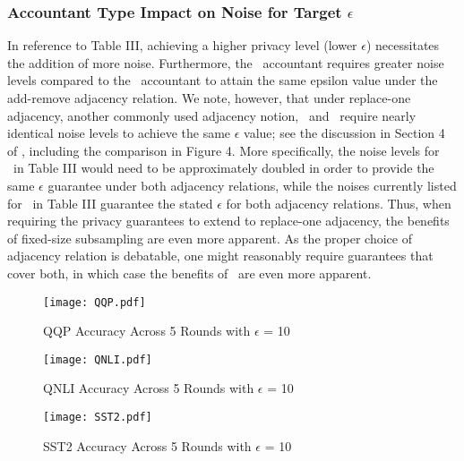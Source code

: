 \subsubsection{Accountant Type Impact on Noise for Target \( \epsilon\)}In reference to Table III, achieving a higher privacy level (lower \( \epsilon\)) necessitates the addition of more noise. Furthermore, the \sys~accountant requires greater noise levels compared to the \rdp~accountant to attain the same epsilon value  under the add-remove adjacency relation. We note, however, that under replace-one adjacency, another commonly used adjacency notion, \rdp~and \sys~require nearly identical noise levels to achieve the same $\epsilon$ value; see the discussion in Section 4 of \cite{birrell2024differentially}, including the comparison in Figure 4. More specifically, the noise levels for \rdp~in Table III would need to be approximately doubled in order to provide the same $\epsilon$ guarantee under both adjacency relations, while the  noises currently listed for \sys~in Table III guarantee the stated $\epsilon$ for both adjacency relations. Thus, when requiring the privacy guarantees to extend to replace-one adjacency, the benefits of fixed-size subsampling are even more apparent.  As the proper choice of adjacency relation is debatable, one might reasonably require guarantees that cover both, in which case the benefits of \sys~are even more apparent.

\begin{figure}[t]
    \centering
    \texttt{[image: QQP.pdf]}
    \caption{QQP Accuracy Across 5 Rounds with \( \epsilon\) = 10 }
    \label{fig:enter-label}
\end{figure}
\begin{figure}[t]
    \centering
    \texttt{[image: QNLI.pdf]}
    \caption{QNLI Accuracy Across 5 Rounds with \( \epsilon\) = 10 }
    \label{fig:enter-label}
\end{figure}
\begin{figure}[t]
    \centering
    \texttt{[image: SST2.pdf]}
    \caption{SST2 Accuracy Across 5 Rounds with \( \epsilon\) = 10 }
    \label{fig:enter-label}
\end{figure}




